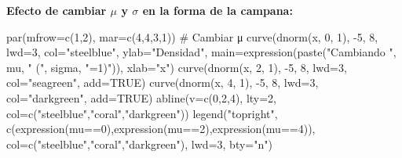 \documentclass[
  letterpaper,
  DIV=11,
  numbers=noendperiod]{scrartcl}
\newenvironment{Shaded}{\begin{snugshade}}{\end{snugshade}}
\newcommand{\AttributeTok}[1]{\textcolor[rgb]{0.40,0.45,0.13}{#1}}
\newcommand{\CommentTok}[1]{\textcolor[rgb]{0.37,0.37,0.37}{#1}}
\newcommand{\ConstantTok}[1]{\textcolor[rgb]{0.56,0.35,0.01}{#1}}
\newcommand{\DecValTok}[1]{\textcolor[rgb]{0.68,0.00,0.00}{#1}}
\newcommand{\FunctionTok}[1]{\textcolor[rgb]{0.28,0.35,0.67}{#1}}
\newcommand{\NormalTok}[1]{\textcolor[rgb]{0.00,0.23,0.31}{#1}}
\newcommand{\SpecialCharTok}[1]{\textcolor[rgb]{0.37,0.37,0.37}{#1}}
\newcommand{\StringTok}[1]{\textcolor[rgb]{0.13,0.47,0.30}{#1}}
\begin{document}
\textbf{Efecto de cambiar \(\mu\) y \(\sigma\) en la forma de la
campana:}

\begin{Shaded}
\begin{Highlighting}[]
\FunctionTok{par}\NormalTok{(}\AttributeTok{mfrow=}\FunctionTok{c}\NormalTok{(}\DecValTok{1}\NormalTok{,}\DecValTok{2}\NormalTok{), }\AttributeTok{mar=}\FunctionTok{c}\NormalTok{(}\DecValTok{4}\NormalTok{,}\DecValTok{4}\NormalTok{,}\DecValTok{3}\NormalTok{,}\DecValTok{1}\NormalTok{))}
\CommentTok{\# Cambiar μ}
\FunctionTok{curve}\NormalTok{(}\FunctionTok{dnorm}\NormalTok{(x, }\DecValTok{0}\NormalTok{, }\DecValTok{1}\NormalTok{), }\SpecialCharTok{{-}}\DecValTok{5}\NormalTok{, }\DecValTok{8}\NormalTok{, }\AttributeTok{lwd=}\DecValTok{3}\NormalTok{, }\AttributeTok{col=}\StringTok{"steelblue"}\NormalTok{, }\AttributeTok{ylab=}\StringTok{"Densidad"}\NormalTok{,}
      \AttributeTok{main=}\FunctionTok{expression}\NormalTok{(}\FunctionTok{paste}\NormalTok{(}\StringTok{"Cambiando "}\NormalTok{, mu, }\StringTok{" ("}\NormalTok{, sigma, }\StringTok{"=1)"}\NormalTok{)), }\AttributeTok{xlab=}\StringTok{"x"}\NormalTok{)}
\FunctionTok{curve}\NormalTok{(}\FunctionTok{dnorm}\NormalTok{(x, }\DecValTok{2}\NormalTok{, }\DecValTok{1}\NormalTok{), }\SpecialCharTok{{-}}\DecValTok{5}\NormalTok{, }\DecValTok{8}\NormalTok{, }\AttributeTok{lwd=}\DecValTok{3}\NormalTok{, }\AttributeTok{col=}\StringTok{"seagreen"}\NormalTok{, }\AttributeTok{add=}\ConstantTok{TRUE}\NormalTok{)}
\FunctionTok{curve}\NormalTok{(}\FunctionTok{dnorm}\NormalTok{(x, }\DecValTok{4}\NormalTok{, }\DecValTok{1}\NormalTok{), }\SpecialCharTok{{-}}\DecValTok{5}\NormalTok{, }\DecValTok{8}\NormalTok{, }\AttributeTok{lwd=}\DecValTok{3}\NormalTok{, }\AttributeTok{col=}\StringTok{"darkgreen"}\NormalTok{, }\AttributeTok{add=}\ConstantTok{TRUE}\NormalTok{)}
\FunctionTok{abline}\NormalTok{(}\AttributeTok{v=}\FunctionTok{c}\NormalTok{(}\DecValTok{0}\NormalTok{,}\DecValTok{2}\NormalTok{,}\DecValTok{4}\NormalTok{), }\AttributeTok{lty=}\DecValTok{2}\NormalTok{, }\AttributeTok{col=}\FunctionTok{c}\NormalTok{(}\StringTok{"steelblue"}\NormalTok{,}\StringTok{"coral"}\NormalTok{,}\StringTok{"darkgreen"}\NormalTok{))}
\FunctionTok{legend}\NormalTok{(}\StringTok{"topright"}\NormalTok{, }\FunctionTok{c}\NormalTok{(}\FunctionTok{expression}\NormalTok{(mu}\SpecialCharTok{==}\DecValTok{0}\NormalTok{),}\FunctionTok{expression}\NormalTok{(mu}\SpecialCharTok{==}\DecValTok{2}\NormalTok{),}\FunctionTok{expression}\NormalTok{(mu}\SpecialCharTok{==}\DecValTok{4}\NormalTok{)),}
       \AttributeTok{col=}\FunctionTok{c}\NormalTok{(}\StringTok{"steelblue"}\NormalTok{,}\StringTok{"coral"}\NormalTok{,}\StringTok{"darkgreen"}\NormalTok{), }\AttributeTok{lwd=}\DecValTok{3}\NormalTok{, }\AttributeTok{bty=}\StringTok{"n"}\NormalTok{)}

\end{Highlighting}
\end{Shaded}
\end{document}
